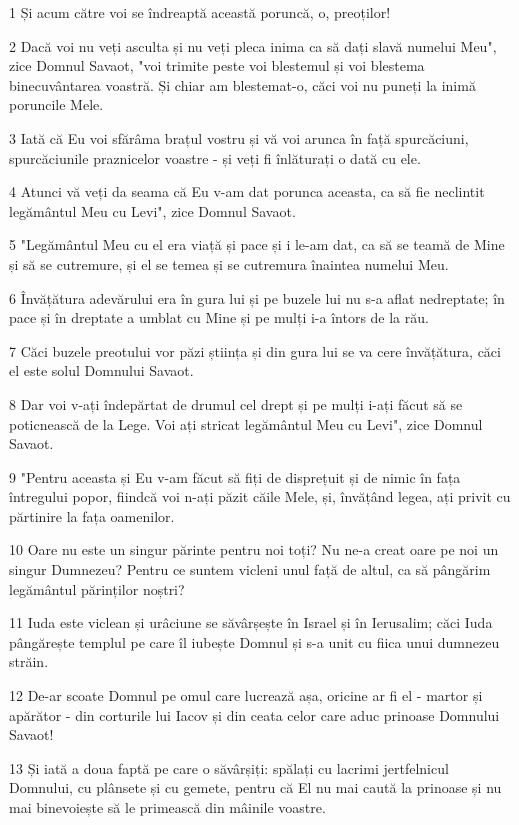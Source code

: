 \par 1 Și acum către voi se îndreaptă această poruncă, o, preoților!
\par 2 Dacă voi nu veți asculta și nu veți pleca inima ca să dați slavă numelui Meu", zice Domnul Savaot, "voi trimite peste voi blestemul și voi blestema binecuvântarea voastră. Și chiar am blestemat-o, căci voi nu puneți la inimă poruncile Mele.
\par 3 Iată că Eu voi sfărâma brațul vostru și vă voi arunca în față spurcăciuni, spurcăciunile praznicelor voastre - și veți fi înlăturați o dată cu ele.
\par 4 Atunci vă veți da seama că Eu v-am dat porunca aceasta, ca să fie neclintit legământul Meu cu Levi", zice Domnul Savaot.
\par 5 "Legământul Meu cu el era viață și pace și i le-am dat, ca să se teamă de Mine și să se cutremure, și el se temea și se cutremura înaintea numelui Meu.
\par 6 Învățătura adevărului era în gura lui și pe buzele lui nu s-a aflat nedreptate; în pace și în dreptate a umblat cu Mine și pe mulți i-a întors de la rău.
\par 7 Căci buzele preotului vor păzi știința și din gura lui se va cere învățătura, căci el este solul Domnului Savaot.
\par 8 Dar voi v-ați îndepărtat de drumul cel drept și pe mulți i-ați făcut să se poticnească de la Lege. Voi ați stricat legământul Meu cu Levi", zice Domnul Savaot.
\par 9 "Pentru aceasta și Eu v-am făcut să fiți de disprețuit și de nimic în fața întregului popor, fiindcă voi n-ați păzit căile Mele, și, învățând legea, ați privit cu părtinire la fața oamenilor.
\par 10 Oare nu este un singur părinte pentru noi toți? Nu ne-a creat oare pe noi un singur Dumnezeu? Pentru ce suntem vicleni unul față de altul, ca să pângărim legământul părinților noștri?
\par 11 Iuda este viclean și urâciune se săvârșește în Israel și în Ierusalim; căci Iuda pângărește templul pe care îl iubește Domnul și s-a unit cu fiica unui dumnezeu străin.
\par 12 De-ar scoate Domnul pe omul care lucrează așa, oricine ar fi el - martor și apărător - din corturile lui Iacov și din ceata celor care aduc prinoase Domnului Savaot!
\par 13 Și iată a doua faptă pe care o săvârșiți: spălați cu lacrimi jertfelnicul Domnului, cu plânsete și cu gemete, pentru că El nu mai caută la prinoase și nu mai binevoiește să le primească din mâinile voastre.

